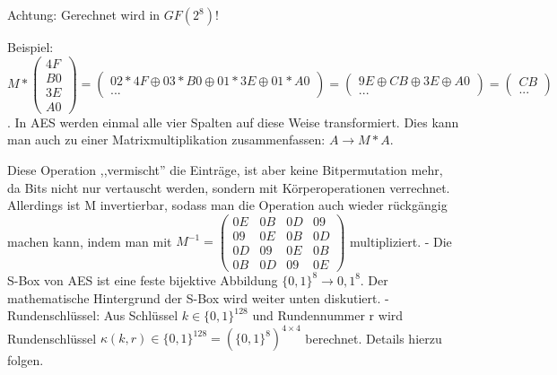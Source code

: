 \documentclass[a4paper]{article}
\begin{document}
\begin{multicols}{3}
    Achtung: Gerechnet wird in $GF(2^8)$!

    Beispiel: $M*\begin{pmatrix} 4F\\ B0\\ 3E\\ A0\end{pmatrix} = \begin{pmatrix} 02*4F\oplus 03*B0\oplus 01*3E\oplus 01*A0\\ ... \end{pmatrix} = \begin{pmatrix} 9E\oplus CB\oplus 3E\oplus A0 \\ ... \end{pmatrix} = \begin{pmatrix} CB\\...\end{pmatrix}$.
    In AES werden einmal alle vier Spalten auf diese Weise transformiert. Dies kann man auch zu einer Matrixmultiplikation zusammenfassen: $A \rightarrow M*A$.

    Diese Operation ,,vermischt'' die Einträge, ist aber keine Bitpermutation mehr, da Bits nicht nur vertauscht werden, sondern mit Körperoperationen verrechnet. Allerdings ist M invertierbar, sodass man die Operation auch wieder rückgängig machen kann, indem man mit $M^{-1}=\begin{pmatrix} 0E& 0B& 0D& 09\\ 09& 0E& 0B& 0D\\ 0D& 09& 0E& 0B\\ 0B& 0D& 09& 0E\end{pmatrix}$ multipliziert.
    - Die S-Box von AES ist eine feste bijektive Abbildung $\{0,1\}^8\rightarrow {0,1}^8$. Der mathematische Hintergrund der S-Box wird weiter unten diskutiert.
    - Rundenschlüssel: Aus Schlüssel $k\in\{0,1\}^{128}$ und Rundennummer r wird Rundenschlüssel $\kappa (k,r)\in\{0,1\}^{128}=(\{0,1\}^8)^{4\times 4}$ berechnet. Details hierzu folgen.


\end{multicols}
\end{document}
